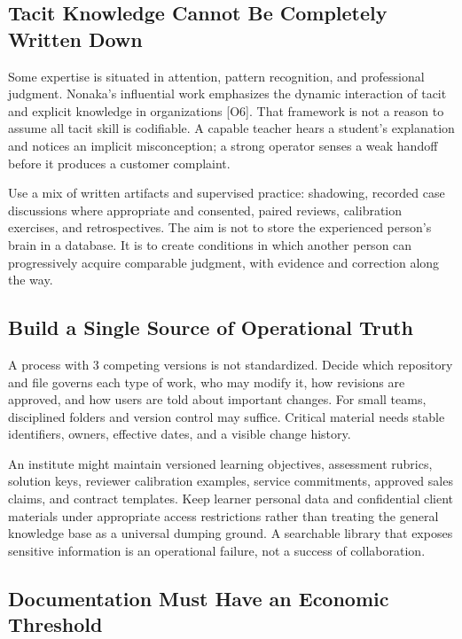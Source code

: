 \subsection{Tacit Knowledge Cannot Be Completely Written Down}
\label{sec:tacit_knowledge_limits}

Some expertise is situated in attention, pattern recognition, and professional judgment. Nonaka's influential work emphasizes the dynamic interaction of tacit and explicit knowledge in organizations [O6]. That framework is not a reason to assume all tacit skill is codifiable. A capable teacher hears a student's explanation and notices an implicit misconception; a strong operator senses a weak handoff before it produces a customer complaint.

Use a mix of written artifacts and supervised practice: shadowing, recorded case discussions where appropriate and consented, paired reviews, calibration exercises, and retrospectives. The aim is not to store the experienced person's brain in a database. It is to create conditions in which another person can progressively acquire comparable judgment, with evidence and correction along the way.

\subsection{Build a Single Source of Operational Truth}
\label{sec:single_source_of_truth}

A process with 3 competing versions is not standardized. Decide which repository and file governs each type of work, who may modify it, how revisions are approved, and how users are told about important changes. For small teams, disciplined folders and version control may suffice. Critical material needs stable identifiers, owners, effective dates, and a visible change history.

An institute might maintain versioned learning objectives, assessment rubrics, solution keys, reviewer calibration examples, service commitments, approved sales claims, and contract templates. Keep learner personal data and confidential client materials under appropriate access restrictions rather than treating the general knowledge base as a universal dumping ground. A searchable library that exposes sensitive information is an operational failure, not a success of collaboration.

\subsection{Documentation Must Have an Economic Threshold}
\label{sec:documentation_economic_threshold}

